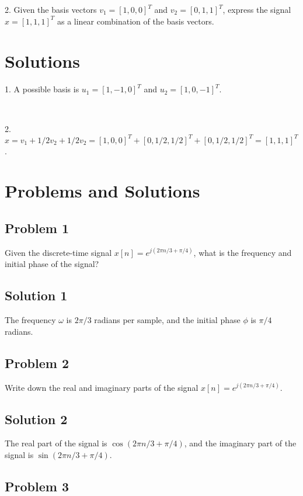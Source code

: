 \documentclass[11pt]{article}
\begin{document}
2. Given the basis vectors $v_1 = [1, 0, 0]^T$ and $v_2 = [0, 1, 1]^T$, express the signal $x = [1, 1, 1]^T$ as a linear combination of the basis vectors.

\section*{Solutions}

1. A possible basis is $u_1 = [1, -1, 0]^T$ and $u_2 = [1, 0, -1]^T$.

\ 

2. $x = v_1 + 1/2 v_2 + 1/2 v_2 = [1, 0, 0]^T + [0, 1/2, 1/2]^T + [0, 1/2, 1/2]^T = [1, 1, 1]^T$.

\newpage

\section*{Problems and Solutions}

\subsection*{Problem 1}

Given the discrete-time signal $x[n] = e^{j(2\pi n/3 + \pi/4)}$, what is the frequency and initial phase of the signal?

\subsection*{Solution 1}

The frequency $\omega$ is $2\pi/3$ radians per sample, and the initial phase $\phi$ is $\pi/4$ radians.

\subsection*{Problem 2}

Write down the real and imaginary parts of the signal $x[n] = e^{j(2\pi n/3  + \pi/4)}$.

\subsection*{Solution 2}

The real part of the signal is $\cos(2\pi n/3 + \pi/4)$, and the imaginary part of the signal is $\sin(2\pi n/3 + \pi/4)$.

\subsection*{Problem 3}
\end{document}
